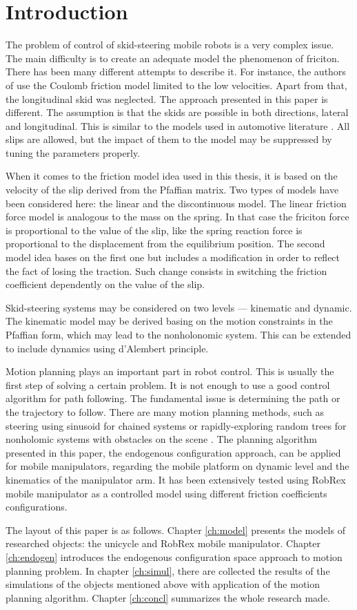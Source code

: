 \chapter{Introduction}
The problem of control of skid-steering mobile robots is a very complex issue. 
The main difficulty is to create an adequate model the phenomenon of friciton. 
There has been many different attempts to describe it.
For instance, the authors of \cite{caracciolo1999trajectory} use the Coulomb friction model limited to the low velocities.
Apart from that, the longitudinal skid was neglected. The approach presented in this paper is different.
The assumption is that the skids are possible in both directions, lateral and longitudinal.
This is similar to the models used in automotive literature \cite{pacejka2005tyre}.
All slips are allowed, but the impact of them to the model may be suppressed by tuning the
parameters properly. 

When it comes to the friction model idea used in this thesis,
it is based on the velocity of the slip derived
from the Pfaffian matrix. %
Two types of models have been considered here: the linear and the discontinuous model.
The linear friction force model is analogous to the mass on the spring. In that case the friciton
force is proportional to the value of the slip, like the spring reaction force is proportional
to the displacement from the equilibrium position. The second model idea bases on the first one
but includes a modification in order to reflect the fact of losing the traction. Such change
consists in switching the friction coefficient dependently on the value of the slip.

Skid-steering systems may be considered on two levels --- kinematic and dynamic.
The kinematic model may be derived basing on the motion constraints in the Pfaffian form, which may lead
to the nonholonomic system. This can be extended to include dynamics using d'Alembert principle.

Motion planning plays an important part in robot control. This is usually the first step of solving
a certain problem. It is not enough to use a good control algorithm for path following. The fundamental
issue is determining the path or the trajectory to follow. There are many motion planning methods,
such as steering using sinusoid for chained systems \cite{murray1993nonholonomic} or rapidly-exploring random trees for nonholomic systems
with obstacles on the scene \cite{lavalle2000rapidly}. The planning algorithm presented in this paper,
the endogenous configuration approach, can be applied for mobile manipulators, regarding the
mobile platform on dynamic level and the kinematics of the manipulator arm. It has been extensively
tested using RobRex mobile manipulator as a controlled model using different
friction coefficients configurations.

The layout of this paper is as follows. Chapter \ref{ch:model} presents the models of researched
objects: the unicycle and RobRex mobile manipulator. Chapter \ref{ch:endogen} introduces the endogenous
configuration space approach to motion planning problem. In chapter \ref{ch:simul}, there are collected
the results of the simulations of the objects mentioned above with application of the motion
planning algorithm. Chapter \ref{ch:concl} summarizes the whole research made.